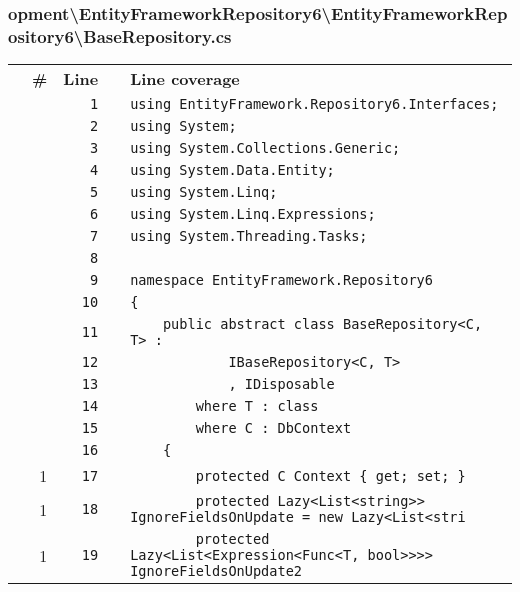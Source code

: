 \documentclass[a4paper,10pt]{article}
\begin{document}
\subsubsection{opment\textbackslash EntityFrameworkRepository6\textbackslash EntityFrameworkRepository6\textbackslash BaseRepository.cs}
\begin{longtable}[l]{lrrll}
\textbf{} & \textbf{\#} & \textbf{Line} & \textbf{} & \textbf{Line coverage}\\
\cellcolor{gray} &  & \verb~1~ & & \verb~using EntityFramework.Repository6.Interfaces;~\\
\cellcolor{gray} &  & \verb~2~ & & \verb~using System;~\\
\cellcolor{gray} &  & \verb~3~ & & \verb~using System.Collections.Generic;~\\
\cellcolor{gray} &  & \verb~4~ & & \verb~using System.Data.Entity;~\\
\cellcolor{gray} &  & \verb~5~ & & \verb~using System.Linq;~\\
\cellcolor{gray} &  & \verb~6~ & & \verb~using System.Linq.Expressions;~\\
\cellcolor{gray} &  & \verb~7~ & & \verb~using System.Threading.Tasks;~\\
\cellcolor{gray} &  & \verb~8~ & & \verb~~\\
\cellcolor{gray} &  & \verb~9~ & & \verb~namespace EntityFramework.Repository6~\\
\cellcolor{gray} &  & \verb~10~ & & \verb~{~\\
\cellcolor{gray} &  & \verb~11~ & & \verb~    public abstract class BaseRepository<C, T> :~\\
\cellcolor{gray} &  & \verb~12~ & & \verb~            IBaseRepository<C, T>~\\
\cellcolor{gray} &  & \verb~13~ & & \verb~            , IDisposable~\\
\cellcolor{gray} &  & \verb~14~ & & \verb~        where T : class~\\
\cellcolor{gray} &  & \verb~15~ & & \verb~        where C : DbContext~\\
\cellcolor{gray} &  & \verb~16~ & & \verb~    {~\\
\cellcolor{green} & 1 & \verb~17~ & & \verb~        protected C Context { get; set; }~\\
\cellcolor{green} & 1 & \verb~18~ & & \verb~        protected Lazy<List<string>> IgnoreFieldsOnUpdate = new Lazy<List<stri~\\
\cellcolor{green} & 1 & \verb~19~ & & \verb~        protected Lazy<List<Expression<Func<T, bool>>>> IgnoreFieldsOnUpdate2 ~\\

\end{longtable}
\end{document}
